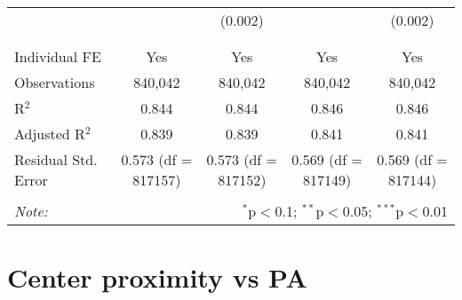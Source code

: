\documentclass[
]{article}
\begin{document}
\begin{table}[!htbp]
{\begin{tabular}{@{\extracolsep{5pt}}lcccc}
  &  & (0.002) &  & (0.002) \\ 
  & & & & \\ 
\hline \\[-1.8ex] 
Individual FE & Yes & Yes & Yes & Yes \\ 
Observations & 840,042 & 840,042 & 840,042 & 840,042 \\ 
R$^{2}$ & 0.844 & 0.844 & 0.846 & 0.846 \\ 
Adjusted R$^{2}$ & 0.839 & 0.839 & 0.841 & 0.841 \\ 
Residual Std. Error & 0.573 (df = 817157) & 0.573 (df = 817152) & 0.569 (df = 817149) & 0.569 (df = 817144) \\ 
\hline 
\hline \\[-1.8ex] 
\textit{Note:}  & \multicolumn{4}{r}{$^{*}$p$<$0.1; $^{**}$p$<$0.05; $^{***}$p$<$0.01} \\ 
\end{tabular}
} 
\end{table} 
\newpage
\section{Center proximity vs PA}
\end{document}
